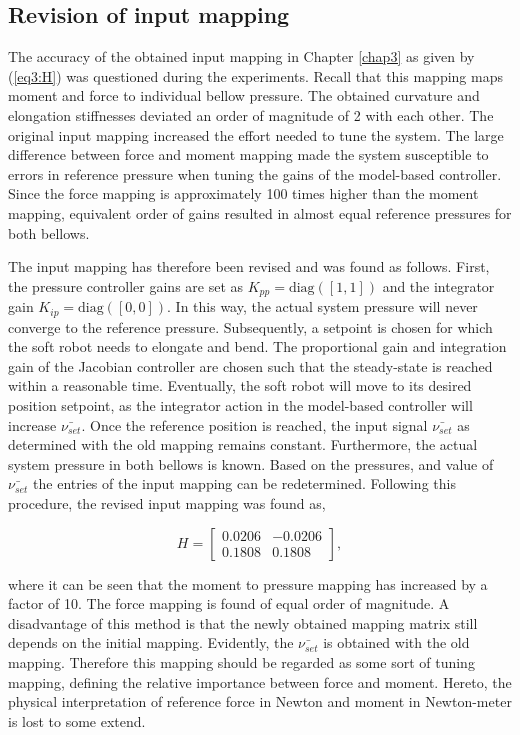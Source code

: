 \subsection*{Revision of input mapping}

The accuracy of the obtained input mapping in Chapter \ref{chap3} as given by (\ref{eq3:H}) was questioned during the experiments. Recall that this mapping maps moment and force to individual bellow pressure. The obtained curvature and elongation stiffnesses deviated an order of magnitude of 2 with each other. The original input mapping increased the effort needed to tune the system. The large difference between force and moment mapping made the system susceptible to errors in reference pressure when tuning the gains of the model-based controller. Since the force mapping is approximately 100 times higher than the moment mapping, equivalent order of gains resulted in almost equal reference pressures for both bellows.

The input mapping has therefore been revised and was found as follows. First, the pressure controller gains are set as $K_{pp} =\text{diag}([1,1])$ and the integrator gain $K_{ip} = \text{diag}([0,0])$. In this way, the actual system pressure will never converge to the reference pressure. Subsequently, a setpoint is chosen for which the soft robot needs to elongate and bend. The proportional gain and integration gain of the Jacobian controller are chosen such that the steady-state is reached within a reasonable time. Eventually, the soft robot will move to its desired position setpoint, as the integrator action in the model-based controller will increase $\bar{\nu_{set}}$. Once the reference position is reached, the input signal $\bar{\nu_{set}}$ as determined with the old mapping remains constant. Furthermore, the actual system pressure in both bellows is known. Based on the pressures, and value of $\bar{\nu_{set}}$ the entries of the input mapping can be redetermined. Following this procedure, the revised input mapping was found as,

\begin{equation}
    H = \begin{bmatrix} 	0.0206 &  -0.0206 \\ 
	0.1808 & 0.1808 \end{bmatrix},
    \label{eq4:revisedH}
\end{equation}

where it can be seen that the moment to pressure mapping has increased by a factor of 10. The force mapping is found of equal order of magnitude. A disadvantage of this method is that the newly obtained mapping matrix still depends on the initial mapping. Evidently, the $\bar{\nu_{set}}$ is obtained with the old mapping. Therefore this mapping should be regarded as some sort of tuning mapping, defining the relative importance between force and moment. Hereto, the physical interpretation of reference force in Newton and moment in Newton-meter is lost to some extend. 

